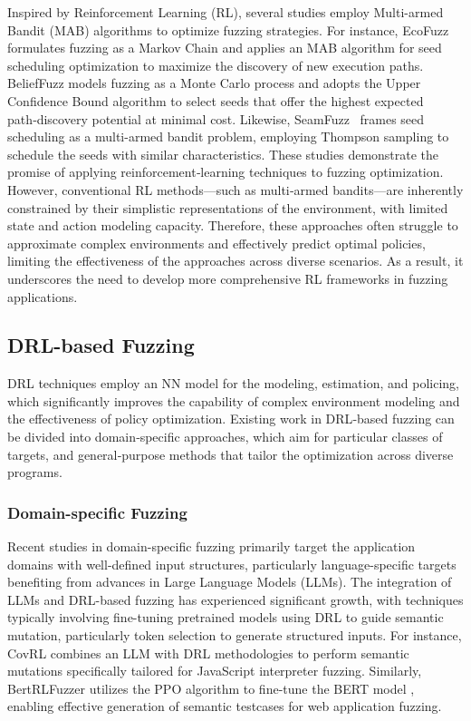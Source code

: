 \documentclass[lettersize,journal]{IEEEtran}
\begin{document}
Inspired by Reinforcement Learning (RL), several studies employ Multi-armed Bandit (MAB) algorithms to optimize fuzzing strategies. For instance, EcoFuzz \cite{yueEcoFuzzAdaptiveEnergysaving2020} formulates fuzzing as a Markov Chain and applies an MAB algorithm for seed scheduling optimization to maximize the discovery of new execution paths. BeliefFuzz \cite{huangBalanceSeedScheduling2023} models fuzzing as a Monte Carlo process and adopts the Upper Confidence Bound algorithm to select seeds that offer the highest expected path‑discovery potential at minimal cost. Likewise, SeamFuzz \cite{leeLearningSeedadaptiveMutation2023} frames seed scheduling as a multi-armed bandit problem, employing Thompson sampling to schedule the seeds with similar characteristics. These studies demonstrate the promise of applying reinforcement‑learning techniques to fuzzing optimization. However, conventional RL methods—such as multi‑armed bandits—are inherently constrained by their simplistic representations of the environment, with limited state and action modeling capacity. Therefore, these approaches often struggle to approximate complex environments and effectively predict optimal policies, limiting the effectiveness of the approaches across diverse scenarios. As a result, it underscores the need to develop more comprehensive RL frameworks in fuzzing applications.

\subsection{DRL-based Fuzzing}
DRL techniques employ an NN model for the modeling, estimation, and policing, which significantly improves the capability of complex environment modeling and the effectiveness of policy optimization. Existing work in DRL‑based fuzzing can be divided into domain‑specific approaches, which aim for particular classes of targets, and general‑purpose methods that tailor the optimization across diverse programs.

\subsubsection{Domain-specific Fuzzing}

Recent studies in domain-specific fuzzing primarily target the application domains with well-defined input structures, particularly language-specific targets benefiting from advances in Large Language Models (LLMs). The integration of LLMs and DRL-based fuzzing has experienced significant growth, with techniques typically involving fine-tuning pretrained models using DRL to guide semantic mutation, particularly token selection to generate structured inputs. For instance, CovRL \cite{eomFuzzingJavaScriptInterpreters2024} combines an LLM with DRL methodologies to perform semantic mutations specifically tailored for JavaScript interpreter fuzzing. Similarly, BertRLFuzzer \cite{jhaBertRLFuzzerBERTReinforcement2024} utilizes the PPO algorithm \cite{schulmanProximalPolicyOptimization2017} to fine-tune the BERT model \cite{devlinBERTPretrainingDeep2019}, enabling effective generation of semantic testcases for web application fuzzing.
\end{document}
